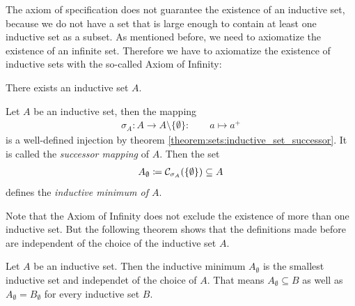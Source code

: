 The axiom of specification does not guarantee the existence of an inductive set, because we do not have a set that is large enough to contain at least one inductive set as a subset. As mentioned before, we need to axiomatize the existence of an infinite set. Therefore we have to axiomatize the existence of inductive sets with the so-called Axiom of Infinity:

\begin{axiom}
    There exists an inductive set $A$.
\end{axiom}


\newcommand\indmin[1]{{#1}_\emptyset}
\begin{definition}
    Let $A$ be an inductive set, then the mapping
    \begin{align}
        \sigma_A\colon A\rightarrow A\setminus\{\emptyset\}\colon \qquad a\mapsto a^+
    \end{align}
    is a well-defined injection by theorem \ref{theorem:sets:inductive_set_successor}. It is called the \emph{successor mapping} of $A$. Then the set
    \begin{align}\indmin A \coloneq \chainset_{\sigma_A}(\{\emptyset\})\subseteq A\end{align}
    defines the \emph{inductive minimum of $A$}.
\end{definition}

Note that the Axiom of Infinity does not exclude the existence of more than one inductive set. But the following theorem shows that the definitions made before are independent of the choice of the inductive set $A$.

\begin{theorem}\label{theorem:natural_numbers:inductive_minimum}
    Let $A$ be an inductive set. Then the inductive minimum $\indmin A$ is the smallest inductive set and independet of the choice of $A$. That means $\indmin A\subseteq B$ as well as $\indmin A=\indmin B$ for every inductive set $B$.
\end{theorem}

